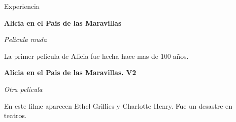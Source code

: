 \begin{rubric}{Experiencia}

		\textbf{Alicia en el Pais de las Maravillas}\par
		\textit{Pelicula muda}\par
    La primer pelicula de Alicia fue hecha hace mas de 100 años.

		\textbf{Alicia en el Pais de las Maravillas. V2}\par
		\textit{Otra pelicula}\par
    En este filme aparecen Ethel Griffies y Charlotte Henry. Fue un
    desastre en teatros.
\end{rubric}
